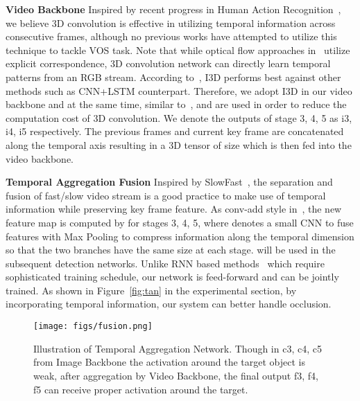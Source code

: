 \documentclass[10pt,twocolumn,letterpaper]{article}
\begin{document}
\textbf{Video Backbone}
Inspired by recent progress in Human Action Recognition~\cite{carreira2017i3d, wang2018nonlocal, feichtenhofer2018slowfast},
we believe 3D convolution is effective in utilizing temporal information across consecutive frames,
although no previous works have attempted to utilize this technique to tackle VOS task.
Note that while optical flow approaches in~\cite{luiten2018premvos,xiao2018jointreid} utilize explicit correspondence,
3D convolution network can directly learn temporal patterns from an RGB stream.
According to~\cite{carreira2017i3d}, I3D performs best against other methods such as CNN+LSTM counterpart.
Therefore, we adopt I3D in our video backbone and at the same time, similar to~\cite{wang2018nonlocal},  and  are used in order to reduce the computation cost of 3D convolution.
We denote the outputs of stage 3, 4, 5 as i3, i4, i5 respectively.
The previous  frames and current key frame are concatenated along the temporal axis resulting in a 3D tensor of size  which is then fed into the video backbone.

\textbf{Temporal Aggregation Fusion}
Inspired by SlowFast~\cite{feichtenhofer2018slowfast}, the separation and fusion of fast/slow video stream is a good practice to make use of  temporal information while preserving key frame feature.
As conv-add style in~\cite{feichtenhofer2018slowfast}, the new feature map  is computed by  for stages 3, 4, 5, where  denotes a small CNN to fuse features with Max Pooling to compress information along the temporal dimension so that the two branches have the same size at each stage.
 will be used in the subsequent detection networks.
Unlike RNN based methods~\cite{xiao2018jointreid, sadeghian2017tracking} which require sophisticated training schedule, our network is feed-forward and can be jointly trained.
As shown in Figure~\ref{fig:tan} in the experimental section, by incorporating temporal information, our system can better handle occlusion.
\begin{figure}[]
\begin{center}
   \texttt{[image: figs/fusion.png]}
\end{center}
\caption{Illustration of Temporal Aggregation Network. Though in c3, c4, c5 from Image Backbone the activation around the target object is weak, after aggregation by Video Backbone, the final output f3, f4, f5 can receive proper activation around the target.}
    \vspace*{-5pt}
\label{fig:fusion}
\end{figure}
\end{document}
